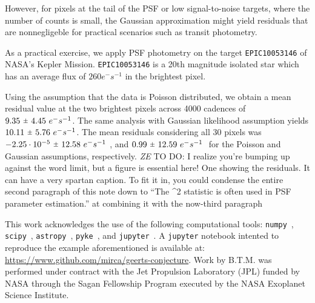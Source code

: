 \documentclass{rnaastex}
\newcommand{\todo}[3]{{\color{#2} \emph{#1} TO DO: #3}}
\newcommand{\zetodo}[1]{\todo{ZE}{cyan}{#1}}
\newcommand{\rpm}{\sbox0{$1$}\sbox2{$\scriptstyle\pm$}
\raise\dimexpr(\ht0-\ht2)/2\relax\box2 }
\begin{document}
However, for pixels at the tail of the PSF or low signal-to-noise targets,
where the number of counts is small, the Gaussian approximation might
yield residuals that are nonnegligeble for practical scenarios such as transit
photometry.

As a practical exercise, we apply PSF photometry on the target
\texttt{EPIC10053146} of NASA's Kepler Mission. \texttt{EPIC10053146} is a
20th magnitude isolated star which has an average flux of $260 e^{-}s^{-1}$ in
the brightest pixel.

Using the assumption that the data is Poisson distributed, we obtain a mean
residual value at the two brightest pixels across 4000 cadences of
$9.35~\rpm~4.45~e^{-}s^{-1}$. The same analysis with Gaussian likelihood
assumption yields $10.11~\rpm~5.76~e^{-}s^{-1}$. The mean residuals
considering all 30 pixels was $-2.25\cdot 10^{-5}~\rpm~12.58~e^{-}s^{-1}~$,
and $0.99~\rpm~12.59~e^{-}s^{-1}~$ for the Poisson and Gaussian assumptions,
respectively.
\zetodo{I realize you're bumping up against the word limit, but a figure is essential here!
One showing the residuals.
It can have a very spartan caption. To fit it in, you could condense the entire second paragraph of 
this note down to ``The \chi^2 statistic is often used in PSF parameter estimation.'' at combining it
with the now-third paragraph}

\acknowledgments This work acknowledges the use of the following computational
tools: \texttt{numpy}~\citep{numpy}, \texttt{scipy}~\citep{scipy},
\texttt{astropy}~\citep{astropy}, \texttt{pyke}~\citep{pyke},
and \texttt{jupyter}~\citep{jupyter}.
A \texttt{jupyter} notebook intented to reproduce the example aforementioned is
available at: \url{https://www.github.com/mirca/geerts-conjecture}.
Work by B.T.M. was performed under contract with the Jet Propulsion Laboratory (JPL) funded by 
NASA through the Sagan Fellowship Program executed by the NASA Exoplanet Science Institute.
\end{document}
